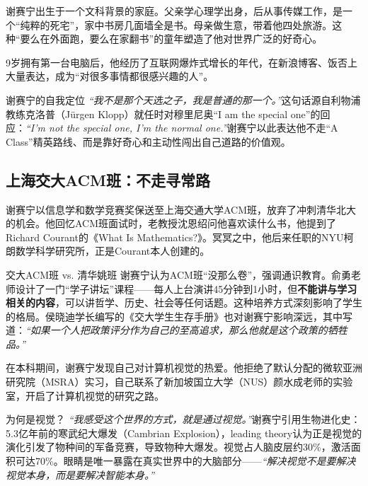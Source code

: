 \documentclass[a4paper]{article}
\begin{document}
谢赛宁出生于一个文科背景的家庭。父亲学心理学出身，后从事传媒工作，是一个``纯粹的死宅''，家中书房几面墙全是书。母亲做生意，带着他四处旅游。这种``要么在外面跑，要么在家翻书''的童年塑造了他对世界广泛的好奇心。

9岁拥有第一台电脑后，他经历了互联网爆炸式增长的年代，在新浪博客、饭否上大量表达，成为``对很多事情都很感兴趣的人''。

\begin{importantbox}{谢赛宁的自我定位}
\textit{``我不是那个天选之子，我是普通的那一个。''}这句话源自利物浦教练克洛普（J\"urgen Klopp）就任时对穆里尼奥``I am the special one''的回应：\textit{``I'm not the special one, I'm the normal one.''}谢赛宁以此表达他不走``A Class''精英路线、而是靠好奇心和主动性闯出自己道路的价值观。
\end{importantbox}

\subsection{上海交大ACM班：不走寻常路}

谢赛宁以信息学和数学竞赛奖保送至上海交通大学ACM班，放弃了冲刺清华北大的机会。他回忆ACM班面试时，老教授沈恩绍问他喜欢读什么书，他提到了Richard Courant的《What Is Mathematics?》。冥冥之中，他后来任职的NYU柯朗数学科学研究所，正是Courant本人创建的。

\begin{knowledgebox}{交大ACM班 vs. 清华姚班}
谢赛宁认为ACM班``没那么卷''，强调通识教育。俞勇老师设计了一门``学子讲坛''课程——每人上台演讲45分钟到1小时，但\textbf{不能讲与学习相关的内容}，可以讲哲学、历史、社会等任何话题。这种培养方式深刻影响了学生的格局。侯晓迪学长编写的《交大学生生存手册》也对谢赛宁影响深远，其中写道：\textit{``如果一个人把政策评分作为自己的至高追求，那么他就是这个政策的牺牲品。''}
\end{knowledgebox}

在本科期间，谢赛宁发现自己对计算机视觉的热爱。他拒绝了默认分配的微软亚洲研究院（MSRA）实习，自己联系了新加坡国立大学（NUS）颜水成老师的实验室，开启了计算机视觉的研究之路。

\begin{importantbox}{为何是视觉？}
\textit{``我感受这个世界的方式，就是通过视觉。''}谢赛宁引用生物进化史：5.3亿年前的寒武纪大爆发（Cambrian Explosion），leading theory认为正是视觉的演化引发了物种间的军备竞赛，导致物种大爆发。视觉占人脑皮层约30\%，激活面积可达70\%。眼睛是唯一暴露在真实世界中的大脑部分——\textit{``解决视觉不是要解决视觉本身，而是要解决智能本身。''}
\end{importantbox}
\end{document}
